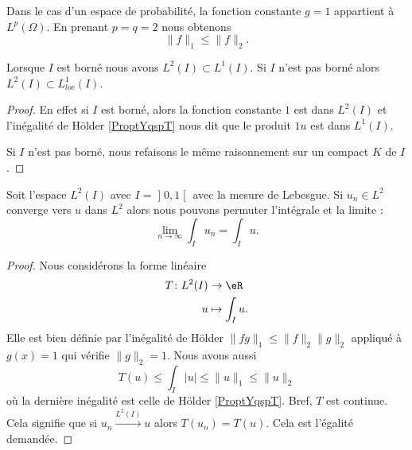 \begin{remark}      \label{RemNormuptNird}
    Dans le cas d'un espace de probabilité, la fonction constante \( g=1\) appartient à \( L^p(\Omega)\). En prenant \( p=q=2\) nous obtenons
    \begin{equation}
        \| f \|_1\leq\| f \|_2.
    \end{equation}
\end{remark}

\begin{lemma}   \label{LemTLHwYzD}
    Lorsque \( I\) est borné nous avons \( L^2(I)\subset L^1(I)\). Si \( I\) n'est pas borné alors \( L^2(I)\subset L^1_{loc}(I)\).
\end{lemma}

\begin{proof}
    En effet si \( I\) est borné, alors la fonction constante \( 1\) est dans \( L^2(I)\) et l'inégalité de Hölder \ref{ProptYqspT} nous dit que le produit \( 1u\) est dans \( L^1(I)\).

    Si \( I\) n'est pas borné, nous refaisons le même raisonnement sur un compact \( K\) de \( I\).
\end{proof}

\begin{corollary}        \label{CORooIIEAooNmbkTo}
    Soit l'espace \( L^2(I)\) avec \( I=\mathopen] 0 , 1 \mathclose[\) avec la mesure de Lebesgue. Si \( u_n\in L^2\) converge vers \( u\) dans \( L^2\) alors nous pouvons permuter l'intégrale et la limite :
        \begin{equation}
            \lim_{n\to \infty} \int_Iu_n=\int_Iu.
        \end{equation}
\end{corollary}

\begin{proof}
    Nous considérons la forme linéaire
    \begin{equation}
        \begin{aligned}
            T\colon L^2(I)&\to \eR \\
            u&\mapsto \int_Iu .
        \end{aligned}
    \end{equation}
    Elle est bien définie par l'inégalité de Hölder \( \| fg \|_1\leq \| f \|_2\| g \|_2\) appliqué à \( g(x)=1\) qui vérifie \( \| g \|_2=1\). Nous avons aussi
    \begin{equation}
        T(u)\leq \int_I| u |\leq \| u \|_1\leq\| u \|_2
    \end{equation}
    où la dernière inégalité est celle de Hölder \ref{ProptYqspT}. Bref, \( T\) est continue. Cela signifie que si \( u_n\stackrel{L^2(I)}{\longrightarrow}u\) alors \( T(u_n)=T(u)\). Cela est l'égalité demandée.
\end{proof}

